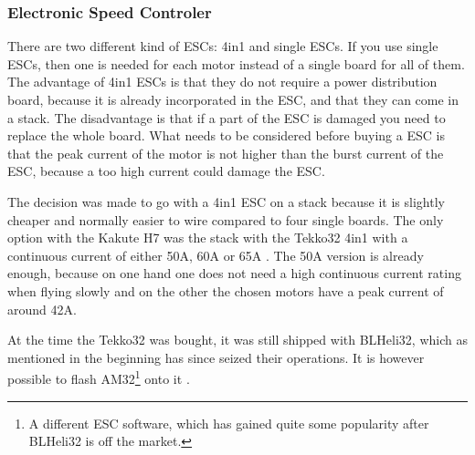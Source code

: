 \documentclass[svgnames]{article}
\begin{document}
	\subsubsection[ESC]{Electronic Speed Controler}
	There are two different kind of \gls{ESC}s: 4in1 and single \glspl{ESC}. If you use single \gls{ESC}s, then one is needed for each motor instead of a single board for all of them. The advantage of 4in1 \gls{ESC}s is that they do not require a power distribution board, because it is already incorporated in the \gls{ESC}, and that they can come in a stack. The disadvantage is that if a part of the \gls{ESC} is damaged you need to replace the whole board. What needs to be considered before buying a \gls{ESC} is that the peak current of the motor is not higher than the burst current of the \gls{ESC}, because a too high current could damage the \gls{ESC}.
	
	The decision was made to go with a 4in1 \gls{ESC} on a stack because it is slightly cheaper and normally easier to wire compared to four single boards. The only option with the Kakute H7 was the stack with the Tekko32 4in1 with a continuous current of either 50A, 60A or 65A \cite{Tekko32}. The 50A version is already enough, because on one hand one does not need a high continuous current rating when flying slowly and on the other the chosen motors have a peak current of around 42A. 
	
	At the time the Tekko32 was bought, it was still shipped with BLHeli32, which as mentioned in the beginning has since seized their operations. It is however possible to flash AM32\footnote{A different \gls{ESC} software, which has gained quite some popularity after BLHeli32 is off the market.} onto it \cite{AM32}.
\end{document}
